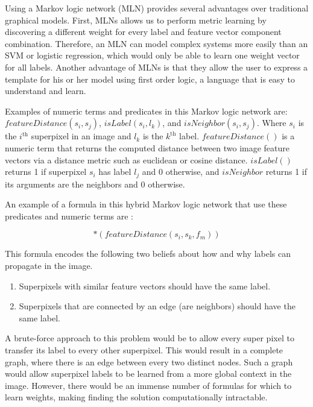 \documentclass{article} %
\begin{document}
	Using a Markov logic network (MLN) provides several advantages over traditional graphical models. First, MLNs allows us to perform metric learning by discovering a different weight for every label and feature vector component combination. Therefore, an MLN can model complex systems more easily than an SVM or logistic regression, which would only be able to learn one weight vector for all labels. Another advantage of MLNs is that they allow the user to express a template for his or her model using first order logic, a language that is easy to understand and learn.

Examples of numeric terms and predicates in this Markov logic network are: $featureDistance(s_i,s_j)$, $isLabel(s_i,l_k)$, and $isNeighbor(s_i,s_j)$. Where $s_i$ is the $i^\textrm{th}$ superpixel in an image and $l_k$ is the $k^\textrm{th}$ label. $featureDistance()$ is a numeric term that returns the computed distance between two image feature vectors via a distance metric such as euclidean or cosine distance. $isLabel()$ returns 1 if superpixel $s_i$ has label $l_j$ and 0 otherwise, and $isNeighbor$ returns 1 if its arguments are the neighbors and 0 otherwise. 

An example of a formula in this hybrid Markov logic network that use these predicates and numeric terms are :

\begin{equation*}
	[isNeighbor(s_i,s_j) \Rightarrow (isLabel(s_i,l_k) \Leftrightarrow isLabel(s_k,l_m))]*(featureDistance(s_i, s_k, f_m))
\end{equation*}

This formula encodes the following two beliefs about how and why labels can propagate in the image.

\begin{enumerate}
\item
	Superpixels with similar feature vectors should have the same label.
\item
	Superpixels that are connected by an edge (are neighbors) should have the same label.
\end{enumerate}

A brute-force approach to this problem would be to allow every super pixel to transfer its label to every other superpixel. This would result in a complete graph, where there is an edge between every two distinct nodes. Such a graph would allow superpixel labels to be learned from a more global context in the image. However, there would be an immense number of formulas for which to learn weights, making finding the solution computationally intractable. 
\end{document}
